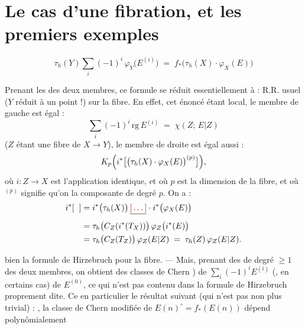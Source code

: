 \documentclass[11pt,a4paper]{article}
\begin{document}
\section*{Le cas d'une fibration, et les premiers exemples}


\[
  \tau_{h}(Y)\sum_{i}(-1)^{i}\,\varphi_{Y}\bigl(E^{(i)}\bigr)
  \;=\; f_{*}\bigl(\tau_{h}(X)\cdot\varphi_{X}(E)\bigr)
  \tag{1 ter}
\]

Prenant les  des deux membres, ce formule se réduit
essentiellement à : R.R. usuel ($Y$ réduit à un
point !) sur la fibre. En effet, cet énoncé étant local, le membre
de gauche est égal :
\[
  \sum_{i}(-1)^{i}\,\mathrm{rg}\,E^{(i)} \;=\; \chi(Z;\,E|Z)
\]
($Z$ étant une fibre de $X \to Y$), le membre de droite est égal aussi :
\[
  K_{p}\Bigl(i^{*}\bigl[\bigl(\tau_{h}(X)\cdot\varphi_{X}(E)\bigr)^{(p)}\bigr]\Bigr),
\]
où $i : Z \to X$ est l'application identique, et où $p$ est la dimension
de la fibre, et où $^{(p)}$ signifie qu'on  la composante de degré $p$. On a  :
\begin{align*}
  i^{*}[\;\;] &= i^{*}\bigl(\tau_{h}(X)\bigr)\,\struck{\ill{}}\cdot
                 i^{*}\bigl(\varphi_{X}(E)\bigr) \\
              &= \tau_{h}\bigl(C_{Z}(i^{*}(T_{X}))\bigr)\,
                 \varphi_{Z}\bigl(i^{*}(E)\bigr) \\
              &= \tau_{h}\bigl(C_{Z}(T_{Z})\bigr)\,\varphi_{Z}(E|Z)
               \;=\; \tau_{h}(Z)\,\varphi_{Z}(E|Z) .
\end{align*}

 bien \add{\ill{}} la formule de Hirzebruch pour la
fibre. --- Mais, prenant des \struck{\ill{}}  de degré
$\geqslant 1$ des deux membres, on obtient des classes de Chern )
de $\sum_{i}(-1)^{i}E^{(i)}$ (, en certains cas) de $E^{(0)}$, ce qui n'est
pas contenu dans la formule de Hirzebruch proprement dite. Ce
 en particulier le résultat suivant (qui n'est pas non plus
trivial) : , la classe de Chern modifiée
de $E(n)^{\circ} = f_{*}(E(n))$ dépend polynômialement \ill{}
\end{document}
